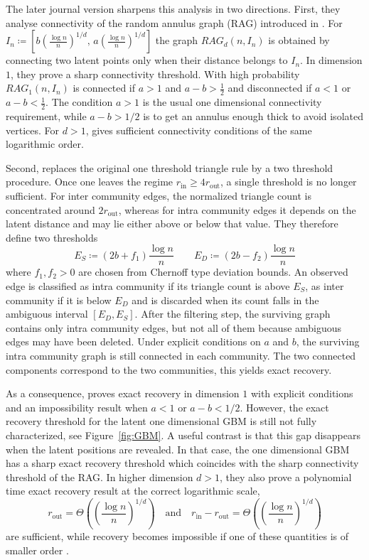 \documentclass[runningheads]{llncs}
\begin{document}
The later journal version \citep{galhotra2023communityrecoverygeometricblock} sharpens this analysis in two directions. First, they analyse connectivity of the random annulus graph (RAG) introduced in \citep{galhotra2020connectivityrandomannulusgraphs}. For
\( I_n \coloneqq \left[b\left(\frac{\log n}{n}\right)^{1/d},\, a\left(\frac{\log n}{n}\right)^{1/d}\right]
\) the graph \(RAG_d(n,I_n)\) is obtained by connecting two latent points only when their distance belongs to \(I_n\). In dimension \(1\), they prove a sharp connectivity threshold. With high probability \(RAG_1(n,I_n)\) is connected  if \(a>1\) and \(a-b>\frac12\)
and disconnected if \(a<1\) or \(a-b<\frac12\).
The condition \(a>1\) is the usual one dimensional connectivity requirement, while \(a-b>1/2\) is to get an annulus enough thick to avoid isolated vertices. For \(d>1\), \citep{galhotra2020connectivityrandomannulusgraphs} gives sufficient connectivity conditions of the same logarithmic order.

Second, \citep{galhotra2023communityrecoverygeometricblock} replaces the original one threshold triangle rule by a two threshold procedure. Once one leaves the regime \(r_\mathrm{in}\ge 4r_\mathrm{out}\), a single threshold is no longer sufficient. For inter community edges, the normalized triangle count is concentrated around \(2r_\mathrm{out}\), whereas for intra community edges it depends on the latent distance and may lie either above or below that value. They therefore define two thresholds
\[
E_S\coloneqq (2b+f_1)\frac{\log n}{n}
\qquad
E_D\coloneqq (2b-f_2)\frac{\log n}{n}
\]
where \(f_1,f_2>0\) are chosen from Chernoff type deviation bounds. An observed edge is classified as intra community if its triangle count is above \(E_S\), as inter community if it is below \(E_D\) and is discarded when its count falls in the ambiguous interval \([E_D,E_S]\). After the filtering step, the surviving graph contains only intra community edges, but not all of them because ambiguous edges may have been deleted.
Under explicit conditions on \(a\) and \(b\), the surviving intra community graph is still connected in each community. The two connected components correspond to the two communities, this yields exact recovery.

As a consequence, \citep{galhotra2023communityrecoverygeometricblock} proves exact recovery in dimension \(1\) with explicit conditions and an impossibility result when \(a<1\) or \(a-b<1/2\). However, the exact recovery threshold for the latent one dimensional GBM is still not fully characterized, see Figure~\ref{fig:GBM}. A useful contrast is that this gap disappears when the latent positions are revealed. In that case, the one dimensional GBM has a sharp exact recovery threshold which coincides with the sharp connectivity threshold of the RAG. In higher dimension \(d>1\), they also prove a polynomial time exact recovery result at the correct logarithmic scale,
\[
r_\mathrm{out}=\Theta\!\left(\left(\frac{\log n}{n}\right)^{1/d}\right)
\quad\text{and}\quad
r_\mathrm{in}-r_\mathrm{out}=\Theta\!\left(\left(\frac{\log n}{n}\right)^{1/d}\right)
\]
are sufficient, while recovery becomes impossible if one of these quantities is of smaller order \citep{galhotra2023communityrecoverygeometricblock}.
\end{document}
